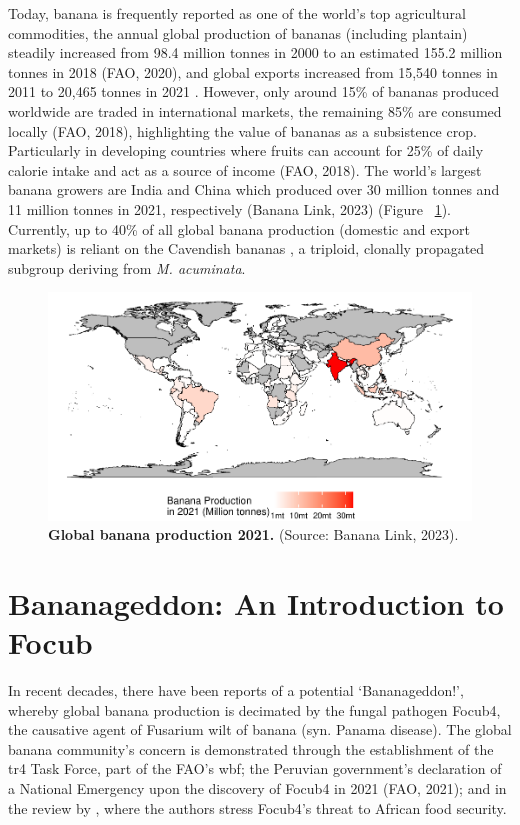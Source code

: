 Today, banana is frequently reported as one of the world’s top agricultural commodities, the annual global production of bananas (including plantain) steadily increased from 98.4 million tonnes in 2000 to an estimated 155.2 million tonnes in 2018 (\ac{FAO}, 2020), and global exports increased from 15,540 tonnes in 2011 to 20,465 tonnes in 2021 \parencite{FAO2022}. However, only around 15\% of bananas produced worldwide are traded in international markets, the remaining 85\% are consumed locally (\ac{FAO}, 2018), highlighting the value of bananas as a subsistence crop. Particularly in developing countries where fruits can account for 25\% of daily calorie intake and act as a source of income (\ac{FAO}, 2018). The world’s largest banana growers are India and China which produced over 30 million tonnes and 11 million tonnes in 2021, respectively (Banana Link, 2023) (Figure ~\ref{fig:bananaProdMap}).  Currently, up to 40\% of all global banana production (domestic and export markets) is reliant on the Cavendish bananas \parencite{Warman2018}, a triploid, clonally propagated subgroup deriving from \textit{M. acuminata}.

\begin{figure}[h!]
    \centering
    \includegraphics[width=15cm]{Figures/BananaProdMap.pdf}
    \caption[Global banana production, 2021]{\textbf{Global banana production 2021.} (Source: Banana Link, 2023).}
    \label{fig:bananaProdMap}
\end{figure}



\section{Bananageddon: An Introduction to \acl{Focub}}

In recent decades, there have been reports of a potential ‘Bananageddon!’, whereby global banana production is decimated by the fungal pathogen \ac{Focub4}, the causative agent of Fusarium wilt of banana (syn. Panama disease). The global banana community’s concern is demonstrated through the establishment of the \acs{tr4} Task Force, part of the \ac{FAO}'s \ac{wbf}; the Peruvian government’s declaration of a National Emergency upon the discovery of \ac{Focub4} in 2021 (FAO, 2021); and in the review by \textcite{Westerhoven2022}, where the authors stress \ac{Focub4}'s threat to African food security.   


